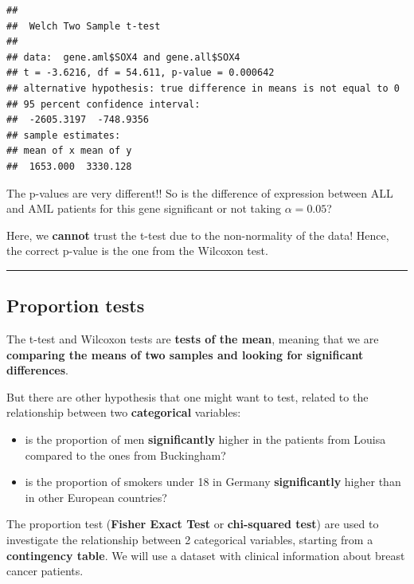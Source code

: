 \documentclass[
]{book}
\newenvironment{Shaded}{\begin{snugshade}}{\end{snugshade}}
\newcommand{\FunctionTok}[1]{\textcolor[rgb]{0.13,0.29,0.53}{\textbf{#1}}}
\newcommand{\NormalTok}[1]{#1}
\newcommand{\SpecialCharTok}[1]{\textcolor[rgb]{0.81,0.36,0.00}{\textbf{#1}}}
\providecommand{\tightlist}{%
  \setlength{\itemsep}{0pt}\setlength{\parskip}{0pt}}
\begin{document}
\begin{Shaded}
\end{Shaded}

\begin{verbatim}
## 
##  Welch Two Sample t-test
## 
## data:  gene.aml$SOX4 and gene.all$SOX4
## t = -3.6216, df = 54.611, p-value = 0.000642
## alternative hypothesis: true difference in means is not equal to 0
## 95 percent confidence interval:
##  -2605.3197  -748.9356
## sample estimates:
## mean of x mean of y 
##  1653.000  3330.128
\end{verbatim}

The p-values are very different!!
So is the difference of expression between ALL and AML patients for this gene significant or not taking \(\alpha=0.05\)?

Here, we \textbf{cannot} trust the t-test due to the non-normality of the data!
Hence, the correct p-value is the one from the Wilcoxon test.

\begin{center}\rule{0.5\linewidth}{0.5pt}\end{center}

\hypertarget{proportion-tests}{%
\subsection{Proportion tests}\label{proportion-tests}}

The t-test and Wilcoxon tests are \textbf{tests of the mean}, meaning that we are \textbf{comparing the means of two samples and looking for significant differences}.

But there are other hypothesis that one might want to test, related to the relationship between two \textbf{categorical} variables:

\begin{itemize}
\tightlist
\item
  is the proportion of men \textbf{significantly} higher in the patients from Louisa compared to the ones from Buckingham?
\item
  is the proportion of smokers under 18 in Germany \textbf{significantly} higher than in other European countries?
\end{itemize}

The proportion test (\textbf{Fisher Exact Test} or \textbf{chi-squared test}) are used to investigate the relationship between 2 categorical variables, starting from a \textbf{contingency table}.
We will use a dataset with clinical information about breast cancer patients.
\end{document}
